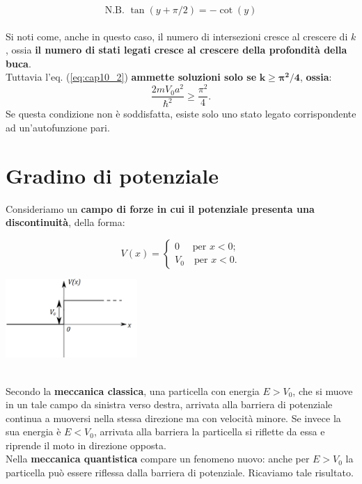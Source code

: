 \documentclass[a4paper,11pt,oneside]{book}
\begin{document}
\[ \textrm{N.B. } \tan (y+\pi/2) = -\cot (y) \]\\
Si noti come, anche in questo caso, il numero di intersezioni cresce al crescere di $k$, ossia \textbf{il numero di stati legati cresce al crescere della profondità della buca}.\\
Tuttavia l'eq. (\ref{eq:cap10_2}) \textbf{ammette soluzioni solo se} $\mathbf{k\geq \pi^2/4}$,\textbf{ ossia}:
\begin{equation}
\frac{2mV_0 a^2}{\hbar ^2} \geq \frac{\pi ^2}{4}.
\end{equation}
Se questa condizione non è soddisfatta, esiste solo uno stato legato corrispondente ad un'autofunzione pari.
\section{Gradino di potenziale}
Consideriamo un \textbf{campo di forze in cui il potenziale presenta una discontinuità}, della forma:\\
\begin{minipage}{.55\textwidth}
\begin{equation}
V(x)=
\begin{cases}
0 \quad \textrm{ per } x<0;\\
V_0 \quad \textrm{per } x<0.
\end{cases}
\end{equation}
\end{minipage}
\hspace{.2cm}
\begin{minipage}{.4\textwidth}
\includegraphics[width=5cm]{immagini/cap_10/fig_10_5.png}
\end{minipage}\\
Secondo la \textbf{meccanica classica}, una particella con energia $E>V_0$, che si muove in un tale campo da sinistra verso destra, arrivata alla barriera di potenziale continua a muoversi nella stessa direzione ma con velocità minore. Se invece la sua energia è $E<V_0$, arrivata alla barriera la particella si riflette da essa e riprende il moto in direzione opposta.\\
Nella \textbf{meccanica quantistica} compare un fenomeno nuovo: anche per $E>V_0$ la particella può essere riflessa dalla barriera di potenziale. Ricaviamo tale risultato.\\
\end{document}
